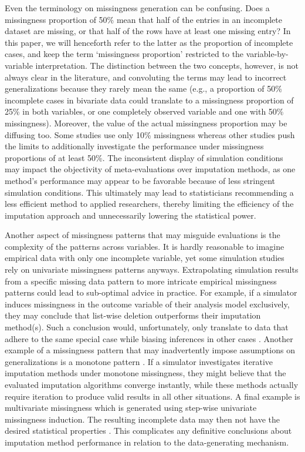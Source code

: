 \documentclass[bimj,fleqn]{w-art}
\begin{document}
Even the terminology on missingness generation can be confusing. Does a missingness proportion of 50\% mean that half of the entries in an incomplete dataset are missing, or that half of the rows have at least one missing entry? In this paper, we will henceforth refer to the latter as the proportion of incomplete cases, and keep the term `missingness proportion' restricted to the variable-by-variable interpretation. The distinction between the two concepts, however, is not always clear in the literature, and convoluting the terms may lead to incorrect generalizations because they rarely mean the same (e.g., a proportion of 50\% incomplete cases in bivariate data could translate to a missingness proportion of 25\% in both variables, or one completely observed variable and one with 50\% missingness). Moreover, the value of the actual missingness proportion may be diffusing too. Some studies use only 10\% missingness whereas other studies push the limits to additionally investigate the performance under missingness proportions of at least 50\%. The inconsistent display of simulation conditions may impact the objectivity of meta-evaluations over imputation methods, as one method's performance may appear to be favorable because of less stringent simulation conditions. This ultimately may lead to statisticians recommending a less efficient method to applied researchers, thereby limiting the efficiency of the imputation approach and unnecessarily lowering the statistical power.

Another aspect of missingness patterns that may misguide evaluations is the complexity of the patterns across variables. It is hardly reasonable to imagine empirical data with only one incomplete variable, yet some simulation studies rely on univariate missingness patterns anyways. Extrapolating simulation results from a specific missing data pattern to more intricate empirical missingness patterns could lead to sub-optimal advice in practice. For example, if a simulator induces missingness in the outcome variable of their analysis model exclusively, they may conclude that list-wise deletion outperforms their imputation method(s). Such a conclusion would, unfortunately, only translate to data that adhere to the same special case while biasing inferences in other cases \citep[][\S 2.7]{buur18}. Another example of a missingness pattern that may inadvertently impose assumptions on generalizations is a monotone pattern \citep[i.e. a pattern with uniformly increasing missingness proportions along variables;][]{litt20}. If a simulator investigates iterative imputation methods under monotone missingness, they might believe that the evaluated imputation algorithms converge instantly, while these methods actually require iteration to produce valid results in all other situations. A final example is multivariate missingness which is generated using step-wise univariate missingness induction. The resulting incomplete data may then not have the desired statistical properties \citep[e.g. skewness;][]{ampute}. This complicates any definitive conclusions about imputation method performance in relation to the data-generating mechanism.
\end{document}
